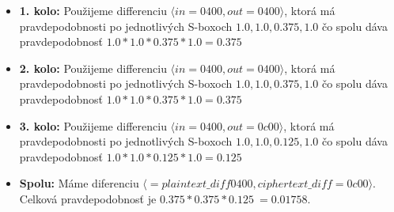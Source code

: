 \begin{itemize}
\item {\bf 1. kolo:}
Použijeme differenciu $\langle in= 0400 , out= 0400 \rangle $,
ktorá má pravdepodobnosti po jednotlivých S-boxoch $
1.0,1.0,0.375,1.0
$ čo spolu dáva pravdepodobnosť 
$ 1.0*1.0*0.375*1.0 = 0.375 $

\item {\bf 2. kolo:}
Použijeme differenciu $\langle in= 0400 , out= 0400 \rangle $,
ktorá má pravdepodobnosti po jednotlivých S-boxoch $
1.0,1.0,0.375,1.0
$ čo spolu dáva pravdepodobnosť 
$ 1.0*1.0*0.375*1.0 = 0.375 $

\item {\bf 3. kolo:}
Použijeme differenciu $\langle in= 0400 , out= 0c00 \rangle $,
ktorá má pravdepodobnosti po jednotlivých S-boxoch $
1.0,1.0,0.125,1.0
$ čo spolu dáva pravdepodobnosť 
$ 1.0*1.0*0.125*1.0 = 0.125 $

\item {\bf Spolu:}  Máme diferenciu $\langle = plaintext\_diff 0400 , ciphertext\_diff= 0c00 \rangle$.
Celková pravdepodobnosť je $ 0.375*0.375*0.125 ~= 0.01758 $.
\end{itemize}
